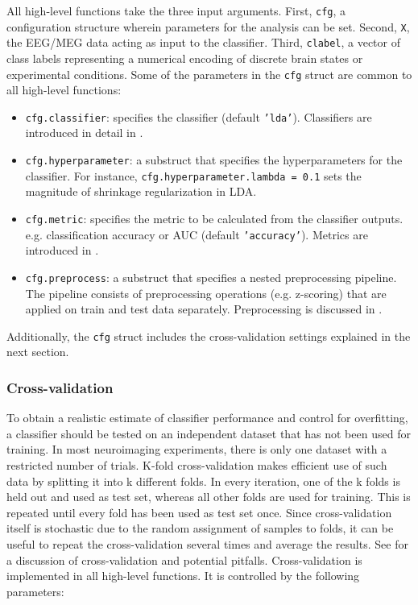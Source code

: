 \documentclass[utf8]{frontiersSCNS} %
\newcommand{\ttt}[1]{\texttt{#1}}
\begin{document}
All high-level functions take the three input arguments. First, \ttt{cfg}, a configuration structure wherein parameters for the analysis can be set. Second, \ttt{X}, the EEG/MEG data acting as input to the classifier. Third, \ttt{clabel}, a vector of class labels representing a numerical encoding of discrete brain states or experimental conditions. Some of the parameters in the \ttt{cfg} struct are common  to all high-level functions:

\begin{itemize}
    \item \ttt{cfg.classifier}: specifies the classifier (default \ttt{'lda'}). Classifiers are introduced in detail in .
    \item \ttt{cfg.hyperparameter}: a substruct that specifies the hyperparameters for the classifier. For instance, \ttt{cfg.hyperparameter.lambda = 0.1} sets the magnitude of shrinkage regularization in LDA.
    \item \ttt{cfg.metric}: specifies the metric to be calculated from the classifier outputs. e.g. classification accuracy or AUC (default \ttt{'accuracy'}). Metrics are introduced in .
    \item \ttt{cfg.preprocess}: a substruct that specifies a nested preprocessing pipeline. The pipeline consists of preprocessing operations (e.g. z-scoring) that are applied on train and test data separately. Preprocessing is discussed in .
\end{itemize}

Additionally, the \ttt{cfg} struct includes the cross-validation settings explained in the next section.


\subsubsection{Cross-validation}

To obtain a realistic estimate of classifier performance and control for overfitting, a classifier should be tested on an independent dataset that has not been used for training. In most neuroimaging experiments, there is only one dataset with a restricted number of trials. K-fold cross-validation makes efficient use of such data by splitting it into k different folds. In every iteration, one of the k folds is held out and used as test set, whereas all other folds are used for training. This is repeated until every fold has been used as test set once. Since cross-validation itself is stochastic due to the random assignment of samples to folds, it can be useful to repeat the cross-validation several times and average the results. See \cite{Lemm2011,Varoquaux2017} for a discussion of cross-validation and potential pitfalls. Cross-validation is implemented in all high-level functions. It is controlled by the following parameters:
\end{document}
